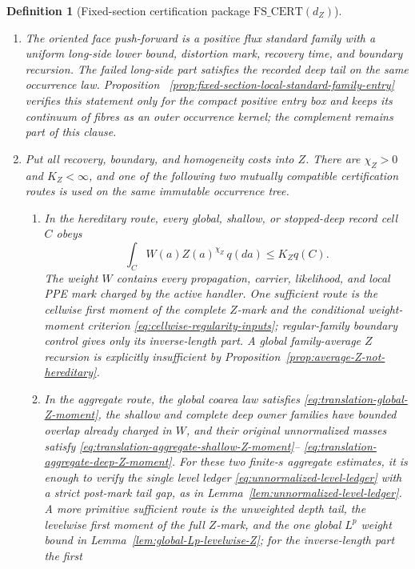 \documentclass[11pt]{article}
\newtheorem{definition}[theorem]{Definition}
\begin{document}
\begin{definition}[Fixed-section certification package
$\mathrm{FS\_CERT}(d_Z)$]
\begin{enumerate}[label=\textup{(FS\arabic*)}]
\eqref{eq:fixed-section-block-DQ-limit-product-rule}; no derivative of a
parameter-dependent inducing time or intermediate $W$-centering is inserted.
\item The oriented face push-forward is a positive flux standard family
with a uniform long-side lower bound, distortion mark, recovery time, and
boundary recursion.  The failed long-side part satisfies the recorded deep
tail on the same occurrence law.  Proposition~
\ref{prop:fixed-section-local-standard-family-entry} verifies this statement
only for the compact positive entry box and keeps its continuum of fibres as
an outer occurrence kernel; the complement remains part of this clause.
\item Put all recovery, boundary, and homogeneity costs into $Z$.  There are
$\chi_Z>0$ and $K_Z<\infty$, and one of the following two mutually
compatible certification routes is used on the same immutable occurrence
tree.
\begin{enumerate}[label=\textup{(FS3\alph*)}]
\item In the hereditary route, every global, shallow, or stopped-deep record
cell $C$ obeys
\begin{equation}
 \int_C W(a)Z(a)^{\chi_Z}\,q(da)
 \le K_Z q(C).
\label{eq:fixed-section-hereditary-Z}
\end{equation}
The weight $W$ contains every propagation, carrier, likelihood, and local
PPE mark charged by the active handler.  One sufficient route is the
cellwise first moment of the complete $Z$-mark and the conditional
weight-moment criterion \eqref{eq:cellwise-regularity-inputs}; regular-family
boundary control gives only its inverse-length part.  A global family-average
$Z$ recursion is explicitly insufficient by
Proposition~\ref{prop:average-Z-not-hereditary}.
\item In the aggregate route, the global coarea law satisfies
\eqref{eq:translation-global-Z-moment}, the shallow and complete deep owner
families have bounded overlap already charged in $W$, and their original
unnormalized masses satisfy
\eqref{eq:translation-aggregate-shallow-Z-moment}--
\eqref{eq:translation-aggregate-deep-Z-moment}.  For these two finite-$s$
aggregate estimates, it is enough to verify the single level ledger
\eqref{eq:unnormalized-level-ledger} with a strict post-mark tail gap, as in
Lemma~\ref{lem:unnormalized-level-ledger}.  A more primitive sufficient
route is the unweighted depth tail, the levelwise first moment of the full
$Z$-mark, and the one global $L^p$ weight bound in
Lemma~\ref{lem:global-Lp-levelwise-Z}; for the inverse-length part the first

\end{enumerate}
\end{enumerate}
\end{definition}
\end{document}
